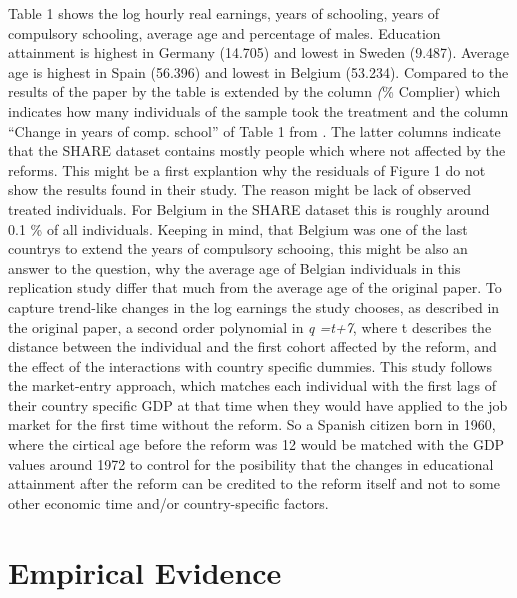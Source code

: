 \documentclass[12pt,a4paper]{article}
\begin{document}
Table 1 shows the log hourly real earnings, years of schooling, years of
compulsory schooling, average age and percentage of males. Education
attainment is highest in Germany (14.705) and lowest in Sweden (9.487).
Average age is highest in Spain (56.396) and lowest in Belgium (53.234).
Compared to the results of the paper by \textcite{brunello} the table is
extended by the column \textit(\% Complier) which indicates how many
individuals of the sample took the treatment and the column
\enquote{Change in years of comp. school} of Table 1 from
\textcite{brunello}. The latter columns indicate that the SHARE dataset
contains mostly people which where not affected by the reforms. This
might be a first explantion why the residuals of Figure 1 do not show
the results \textcite{brunello} found in their study. The reason might
be lack of observed treated individuals. For Belgium in the SHARE
dataset this is roughly around 0.1 \% of all individuals. Keeping in
mind, that Belgium was one of the last countrys to extend the years of
compulsory schooing, this might be also an answer to the question, why
the average age of Belgian individuals in this replication study differ
that much from the average age of the original paper. To capture
trend-like changes in the log earnings the study chooses, as described
in the original paper, a second order polynomial in \textit{q =t+7},
where t describes the distance between the individual and the first
cohort affected by the reform, and the effect of the interactions with
country specific dummies. This study follows the market-entry approach,
which matches each individual with the first lags of their country
specific GDP at that time when they would have applied to the job market
for the first time without the reform. So a Spanish citizen born in
1960, where the cirtical age before the reform was 12 would be matched
with the GDP values around 1972 to control for the posibility that the
changes in educational attainment after the reform can be credited to
the reform itself and not to some other economic time and/or
country-specific factors.

\hypertarget{empirical-evidence}{%
\section{Empirical Evidence}\label{empirical-evidence}}
\end{document}
